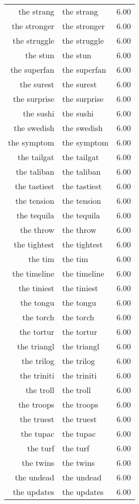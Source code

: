 \begin{table}[ht]
\begin{tabular}{rlr}
  the strang & the strang & 6.00 \\ 
  the stronger & the stronger & 6.00 \\ 
  the struggle & the struggle & 6.00 \\ 
  the stun & the stun & 6.00 \\ 
  the superfan & the superfan & 6.00 \\ 
  the surest & the surest & 6.00 \\ 
  the surprise & the surprise & 6.00 \\ 
  the sushi & the sushi & 6.00 \\ 
  the swedish & the swedish & 6.00 \\ 
  the symptom & the symptom & 6.00 \\ 
  the tailgat & the tailgat & 6.00 \\ 
  the taliban & the taliban & 6.00 \\ 
  the tastiest & the tastiest & 6.00 \\ 
  the tension & the tension & 6.00 \\ 
  the tequila & the tequila & 6.00 \\ 
  the throw & the throw & 6.00 \\ 
  the tightest & the tightest & 6.00 \\ 
  the tim & the tim & 6.00 \\ 
  the timeline & the timeline & 6.00 \\ 
  the tiniest & the tiniest & 6.00 \\ 
  the tongu & the tongu & 6.00 \\ 
  the torch & the torch & 6.00 \\ 
  the tortur & the tortur & 6.00 \\ 
  the triangl & the triangl & 6.00 \\ 
  the trilog & the trilog & 6.00 \\ 
  the triniti & the triniti & 6.00 \\ 
  the troll & the troll & 6.00 \\ 
  the troops & the troops & 6.00 \\ 
  the truest & the truest & 6.00 \\ 
  the tupac & the tupac & 6.00 \\ 
  the turf & the turf & 6.00 \\ 
  the twins & the twins & 6.00 \\ 
  the undead & the undead & 6.00 \\ 
  the updates & the updates & 6.00 \\ 

\end{tabular}
\end{table}
